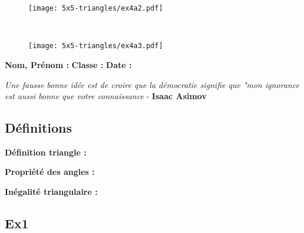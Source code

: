 \begin{minipage}[t]{0.4\textwidth}
  \begin{figure}[H]
    \centering
    \texttt{[image: 5x5-triangles/ex4a2.pdf]}
  \end{figure}
\end{minipage}
\begin{minipage}[t]{0.6\textwidth}
  \Pointilles[10] \\
\end{minipage}

\begin{minipage}[t]{0.4\textwidth}
\begin{figure}[H]
    \centering
    \texttt{[image: 5x5-triangles/ex4a3.pdf]}
  \end{figure} 
\end{minipage}
\begin{minipage}[t]{0.6\textwidth}
  \Pointilles[10]
\end{minipage}

\newpage

\textbf{Nom, Prénom :} \hspace{8cm} \textbf{Classe :} \hspace{3cm} \textbf{Date :}\\
\vspace{-0.8cm}
\begin{center}
  \textit{Une fausse bonne idée est de croire que la démocratie signifie que "mon ignorance est aussi bonne que votre connaissance}  - \textbf{Isaac Asimov}
\end{center}
\vspace{-0.8cm}

\subsection*{Définitions}

\textbf{Définition triangle :} \dotfill \\
\Pointilles[1]

\textbf{Propriété des angles :} \dotfill \\
\Pointilles[2]

\textbf{Inégalité triangulaire :} \dotfill \\
\Pointilles[2]


\subsection*{Ex1}

